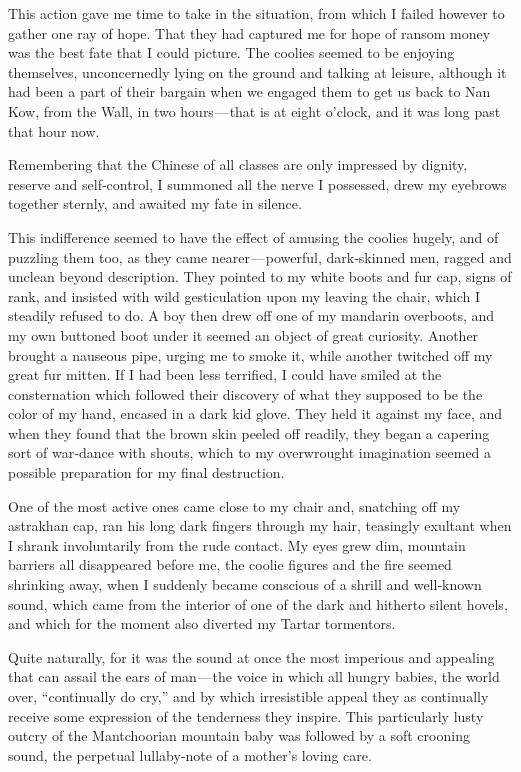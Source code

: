 \documentclass[12pt]{book}
\begin{document}
This action gave me time to take in the situation, from which I failed however to
gather one ray of hope. That they had captured me for hope of ransom money was
the best fate that I could picture. The coolies seemed to be enjoying themselves,
unconcernedly lying on the ground and talking at leisure, although it had been a
part of their bargain when we engaged them to get us back to Nan Kow, from the
Wall, in two hours — that is at eight o’clock, and it was long past that hour now.

Remembering that the Chinese of all classes are only impressed by dignity,
reserve and self‐control, I summoned all the nerve I possessed, drew my eyebrows
together sternly, and awaited my fate in silence.

This indifference seemed to have the effect of amusing the coolies hugely,
and of puzzling them too, as they came nearer — powerful, dark‐skinned men,
ragged and unclean beyond description. They pointed to my white boots and
fur cap, signs of rank, and insisted with wild gesticulation upon my leaving the
chair, which I steadily refused to do. A boy then drew off one of my mandarin
overboots, and my own buttoned boot under it seemed an object of great curiosity.
Another brought a nauseous pipe, urging me to smoke it, while another twitched
off my great fur mitten. If I had been less terrified, I could have smiled at the
consternation which followed their discovery of what they supposed to be the
color of my hand, encased in a dark kid glove. They held it against my face, and
when they found that the brown skin peeled off readily, they began a capering
sort of war‐dance with shouts, which to my overwrought imagination seemed a
possible preparation for my final destruction.

One of the most active ones came close to my chair and, snatching off my
astrakhan cap, ran his long dark fingers through my hair, teasingly exultant when I
shrank involuntarily from the rude contact. My eyes grew dim, mountain barriers
all disappeared before me, the coolie figures and the fire seemed shrinking away,
when I suddenly became conscious of a shrill and well‐known sound, which came
from the interior of one of the dark and hitherto silent hovels, and which for the
moment also diverted my Tartar tormentors.

Quite naturally, for it was the sound at once the most imperious and appealing
that can assail the ears of man — the voice in which all hungry babies, the world
over, “continually do cry,” and by which irresistible appeal they as continually
receive some expression of the tenderness they inspire. This particularly lusty
outcry of the Mantchoorian mountain baby was followed by a soft crooning sound,
the perpetual lullaby‐note of a mother’s loving care.
\end{document}
